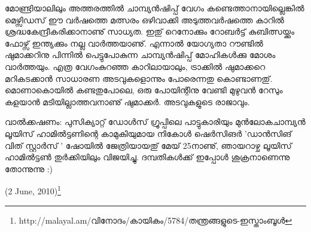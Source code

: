 മോണ്ട്രിയാലിലും അത്തരത്തില്‍ ചാമ്പ്യന്‍ഷിപ്പ് വേഗം കണ്ടെത്താനായില്ലെങ്കില്‍ മെഴ്സിഡസ് ഈ വര്‍ഷത്തെ മത്സരം 
ഒഴിവാക്കി അടുത്തവര്‍ഷത്തെ കാറില്‍ ശ്രദ്ധകേന്ദ്രീകരിക്കാനാണു് സാധ്യത. ഇതു് റെനോക്കും റോബര്‍ട്ട് കുബിത്സയ്ക്കും 
ഫോഴ്സ് ഇന്ത്യക്കും നല്ല വാര്‍ത്തയാണു്. എന്നാല്‍ യോഗ്യതാ റൗണ്ടില്‍ ഷുമാക്കറിനു പിന്നില്‍ പെട്ടുപോകുന്ന 
ചാമ്പ്യന്‍ഷിപ്പ് മോഹികള്‍ക്കു മോശം വാര്‍ത്തയും. എത്ര വേഗംകുറഞ്ഞ കാറിലായാലും, ട്രാക്കില്‍ ഷുമാക്കറെ മറികടക്കാന്‍
സാധാരണ അടവുകളൊന്നും പോരെന്നതു കൊണ്ടാണതു്. മൊണാകൊയില്‍ കണ്ടതുപോലെ, ഒരു പോയിന്റിനു വേണ്ടി 
മുഴുവന്‍ റേസും കളയാന്‍ മടിയില്ലാത്തവനാണു് ഷുമാക്കര്‍. അടവുകളുടെ രാജാവും.

വാല്‍ക്കഷണം: പുസിക്യാറ്റ് ഡോള്‍സ് ഗ്രൂപ്പിലെ പാട്ടുകാരിയും മുന്‍ലോകചാമ്പ്യന്‍ ലൂയിസ് ഹാമില്‍ട്ടണിന്റെ 
കാമുകിയുമായ നികോള്‍ ഷെര്‍സിങര്‍ 'ഡാന്‍സിങ് വിത് സ്റ്റാര്‍സ് ' ഷോയില്‍ ജേത്രിയായതു് മേയ് 25നാണു്, 
ഞായറാഴ്ച ലൂയിസ് ഹാമില്‍ട്ടണ്‍ തുര്‍ക്കിയിലും വിജയിച്ചു. ദമ്പതികള്‍ക്ക് ഇപ്പോള്‍ ശുക്രനാണെന്നു തോന്നുന്നു :)

\hspace*{2em}(2 June, 2010)\footnote{http://malayal.am/വിനോദം/കായികം/5784/തന്ത്രങ്ങളുടെ-ഇസ്താംബൂള്‍}

\newpage
